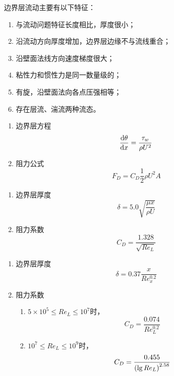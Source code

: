 边界层流动主要有以下特征：

\begin{enumerate}
	\item 与流动问题特征长度相比，厚度很小；
	\item 沿流动方向厚度增加，边界层边缘不与流线重合；
	\item 沿壁面法线方向速度梯度很大；
	\item 粘性力和惯性力是同一数量级的；
	\item 有旋，沿壁面法向各点压强相等；
	\item 存在层流、湍流两种流态。
\end{enumerate}


\begin{enumerate}
	\item 边界层方程
	\begin{equation}
		\dv{\theta}{x} = \dfrac{\tau_{w}}{\rho U^2}
	\end{equation}
    \item 阻力公式
    \begin{equation}
    	F_D = C_D \dfrac{1}{2} \rho U^2 A
    \end{equation}
\end{enumerate}


\begin{enumerate}
    \item 边界层厚度
    \begin{equation}
    	\delta = 5.0 \sqrt{\dfrac{\mu x}{\rho U}}
    \end{equation}
    \item 阻力系数
    \begin{equation}
    	C_D = \dfrac{1.328}{\sqrt{Re_L}}
    \end{equation}
\end{enumerate}


\begin{enumerate}
	\item 边界层厚度
	\begin{equation}
		\delta = 0.37 \dfrac{x}{Re_x^{0.2}}
	\end{equation}
	\item 阻力系数
	\begin{enumerate}
		\item $5 \times 10^5 \leq Re_L \leq 10^7$时，
		\begin{equation}
			C_D = \dfrac{0.074}{Re_L^{0.2}}
		\end{equation}
	    \item $10^7 \leq Re_L \leq 10^9$时，
	    \begin{equation}
	    	C_D = \dfrac{0.455}{\qty(\lg Re_L)^{2.58}}
	    \end{equation}
	\end{enumerate}
\end{enumerate}

